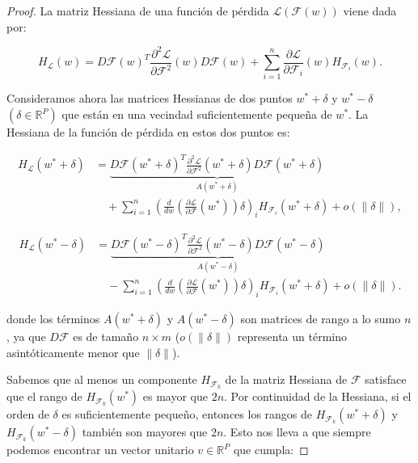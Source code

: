 \begin{proof}
    La matriz Hessiana de una función de pérdida $\mathcal{L}(\mathcal{F}(w))$ viene dada por:

    \[
        H_{\mathcal{L}}(w) = D\mathcal{F}(w)^T \frac{\partial^2 \mathcal{L}}{\partial \mathcal{F}^2}(w) D\mathcal{F}(w) + \sum_{i=1}^{n} \frac{\partial \mathcal{L}}{\partial \mathcal{F}_i}(w) H_{\mathcal{F}_i}(w).
    \]

    Consideramos ahora las matrices Hessianas de dos puntos $w^* + \delta $ y $w^* - \delta $ $(\delta \in \mathbb{R}^{P})$ que están en una vecindad suficientemente pequeña de $w^*$. La Hessiana de la función de pérdida en estos dos puntos es:

    \begin{equation}\label{eq:non-convexity1}
        \begin{aligned}
            H_{\mathcal{L}}( w^* + \delta) &=  
            \underbrace{D\mathcal{F}( w^* + \delta)^T \frac{\partial^2 \mathcal{L}}{\partial \mathcal{F}^2}( w^* + \delta) D\mathcal{F}( w^* + \delta)}_{A( w^* + \delta)} \\
            &\quad + \sum_{i=1}^{n} \left( \frac{d}{d w} \left( \frac{\partial \mathcal{L}}{\partial \mathcal{F}}( w^*) \right) \delta \right)_i H_{\mathcal{F}_i}( w^* + \delta) + o(\|\delta\|),
        \end{aligned}
    \end{equation}
        
    \begin{align}
        H_{\mathcal{L}}( w^* - \delta) &=  
        \underbrace{D\mathcal{F}( w^* - \delta)^T \frac{\partial^2 \mathcal{L}}{\partial \mathcal{F}^2}( w^* - \delta) D\mathcal{F}( w^* - \delta)}_{A( w^* - \delta)} \nonumber \\
        &\quad - \sum_{i=1}^{n} \left( \frac{d}{d w} \left( \frac{\partial \mathcal{L}}{\partial \mathcal{F}}( w^*) \right) \delta \right)_i H_{\mathcal{F}_i}( w^* + \delta) + o(\|\delta\|).
    \end{align}
        

    donde los términos $ A( w^* + \delta) $ y $ A( w^* - \delta) $ son matrices de rango a lo sumo $ n $, ya que $ D\mathcal{F} $ es de tamaño $ n \times m $ ($o(\|\delta\|)$ representa un término asintóticamente menor que $\| \delta \|$).\newline

    Sabemos que al menos un componente $ H_{\mathcal{F}_k} $ de la matriz Hessiana de $ \mathcal{F} $ satisface que el rango de $ H_{\mathcal{F}_k}( w^*) $ es mayor que $ 2n $. Por continuidad de la Hessiana, si el orden de $ \delta $ es suficientemente pequeño, entonces los rangos de $ H_{\mathcal{F}_k}( w^* + \delta) $ y $ H_{\mathcal{F}_k}( w^* - \delta) $ también son mayores que $ 2n $. Esto nos lleva a que siempre podemos encontrar un vector unitario $v \in \mathbb{R}^P $ que cumpla:


\end{proof}
